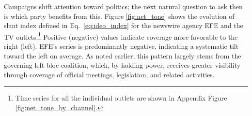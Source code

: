 \documentclass[12pt]{article}
\begin{document}
	

	

	
		\FloatBarrier
	



Campaigns shift attention toward politics; the next natural question to ask then is which party benefits from this.   Figure \ref{fig:net_tone} shows the  evolution of slant index defined in Eq.~\eqref{eq:ideo_index}  for the newswire agency EFE and  the TV outlets.\footnote{Time series for all the individual outlets are shown in Appendix Figure \ref{fig:net_tone_by_channel}.} Positive (negative) values indicate coverage more favorable to the right (left).  EFE’s series is predominantly negative, indicating a systematic tilt toward the left on average. As noted earlier, this pattern largely stems from the governing left-bloc coalition, which, by holding power, receives greater visibility through coverage of official meetings, legislation, and related activities.


\end{document}
